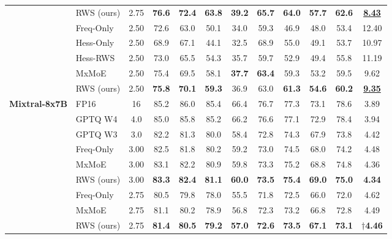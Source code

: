 \begin{table}[!t]
\begin{tabular}{llcccccccccc}
                      & RWS (ours)  & 2.75 & \textbf{76.6} & \textbf{72.4} & \textbf{63.8} & \textbf{39.2} & \textbf{65.7} & \textbf{64.0} & \textbf{57.7} & \textbf{62.6} &  \underline{\textbf{8.43}} \\
\cmidrule(lr){2-12}
                      & Freq-Only   & 2.50 & 72.6 & 63.0 & 50.1 & 34.0 & 59.3 & 46.9 & 48.0 & 53.4 &  12.40 \\
                      & Hess-Only   & 2.50 & 68.9 & 67.1 & 44.1 & 32.5 & 68.9 & 55.0 & 49.1 & 53.7 &  10.97 \\
                      & Hess-RWS    & 2.50 & 73.0 & 65.5 & 54.3 & 35.7 & 59.7 & 52.9 & 49.4 & 55.8 &  11.19 \\
                      & MxMoE       & 2.50 & 75.4 & 69.5 & 58.1 & \textbf{37.7} & \textbf{63.4} & 59.3 & 53.2 & 59.5 &   9.62 \\
                      & RWS (ours)  & 2.50 & \textbf{75.8} & \textbf{70.1} & \textbf{59.3} & 36.9 & 63.0 & \textbf{61.3} & \textbf{54.6} & \textbf{60.2} &  \underline{\textbf{9.35}} \\
\midrule
\textbf{Mixtral-8x7B} & FP16    & 16   & 85.2 & 86.0 & 85.4 & 66.4 & 76.7 & 77.3 & 73.1 & 78.6 &  3.89 \\
                      & GPTQ W4 & 4.0  & 85.0 & 85.8 & 85.2 & 66.2 & 76.6 & 77.1 & 72.9 & 78.4 &  3.94 \\
                      & GPTQ W3 & 3.0  & 82.2 & 81.3 & 80.0 & 58.4 & 72.8 & 74.3 & 67.9 & 73.8 &  4.42 \\
\cmidrule(lr){2-12}
                      & Freq-Only   & 3.00 & 82.5 & 81.8 & 80.2 & 59.2 & 73.0 & 74.5 & 68.0 & 74.2 &   4.48 \\
                      & MxMoE       & 3.00 & 83.1 & 82.2 & 80.9 & 59.8 & 73.3 & 75.2 & 68.8 & 74.8 &   4.36 \\
                      & RWS (ours)  & 3.00 & \textbf{83.3} & \textbf{82.4} & \textbf{81.1} & \textbf{60.0} & \textbf{73.5} & \textbf{75.4} & \textbf{69.0} & \textbf{75.0} &  \textbf{4.34} \\
\cmidrule(lr){2-12}
                      & Freq-Only   & 2.75 & 80.5 & 79.8 & 78.0 & 55.5 & 71.8 & 72.5 & 66.0 & 72.0 &   4.62 \\
                      & MxMoE       & 2.75 & 81.1 & 80.2 & 78.9 & 56.8 & 72.3 & 73.2 & 66.8 & 72.8 &   4.49 \\
                      & RWS (ours)  & 2.75 & \textbf{81.4} & \textbf{80.5} & \textbf{79.2} & \textbf{57.0} & \textbf{72.6} & \textbf{73.5} & \textbf{67.1} & \textbf{73.1} & $\dagger$\textbf{4.46} \\

\end{tabular}
\end{table}

